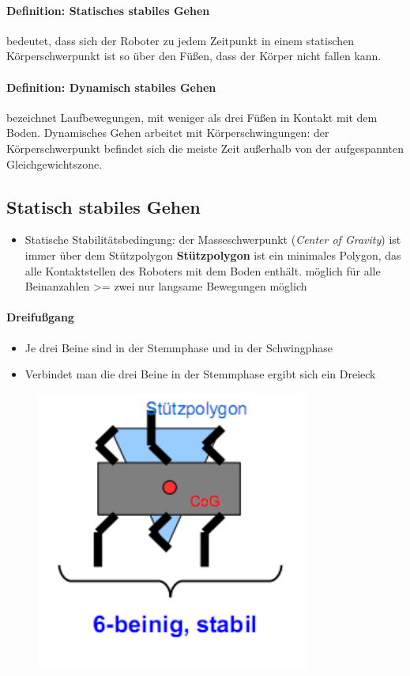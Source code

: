 \paragraph{Definition: Statisches stabiles Gehen}
bedeutet, dass sich der Roboter zu jedem Zeitpunkt in einem statischen Körperschwerpunkt ist so über den Füßen, dass der Körper nicht fallen kann.
\paragraph{Definition: Dynamisch stabiles Gehen}
bezeichnet Laufbewegungen, mit weniger als drei Füßen in Kontakt mit dem Boden.
Dynamisches Gehen arbeitet mit Körperschwingungen: der Körperschwerpunkt befindet sich die meiste Zeit außerhalb von der aufgespannten Gleichgewichtszone.
\subsection{Statisch stabiles Gehen}
\begin{itemize}
	\item Statische Stabilitätsbedingung: der Masseschwerpunkt (\textit{Center of Gravity}) ist immer über dem Stützpolygon
	\subitem \textbf{Stützpolygon} ist ein minimales Polygon, das alle Kontaktstellen des Roboters mit dem Boden enthält.
	\subitem möglich für alle Beinanzahlen >= zwei
	\subitem nur langsame Bewegungen möglich	
\end{itemize}
\paragraph{Dreifußgang}
\begin{itemize}
	\item Je drei Beine sind in der Stemmphase und in der Schwingphase
	\item Verbindet man die drei Beine in der Stemmphase ergibt sich ein Dreieck
\end{itemize}
\begin{figure}[H]
	\begin{center}
		\includegraphics[scale=0.6]{Resources/PNG/DreiBein.PNG}
		\caption{}
		\label{fig:Resources/PNG/DreiBein.PNG}
	\end{center}
\end{figure}
